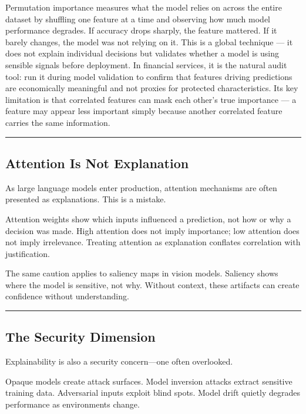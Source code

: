 \documentclass[
  letterpaper,
  DIV=11,
  numbers=noendperiod]{scrartcl}
\begin{document}
Permutation importance measures what the model relies on across the
entire dataset by shuffling one feature at a time and observing how much
model performance degrades. If accuracy drops sharply, the feature
mattered. If it barely changes, the model was not relying on it. This is
a global technique --- it does not explain individual decisions but
validates whether a model is using sensible signals before deployment.
In financial services, it is the natural audit tool: run it during model
validation to confirm that features driving predictions are economically
meaningful and not proxies for protected characteristics. Its key
limitation is that correlated features can mask each other's true
importance --- a feature may appear less important simply because
another correlated feature carries the same information.

\begin{center}\rule{0.5\linewidth}{0.5pt}\end{center}

\subsection{Attention Is Not
Explanation}\label{attention-is-not-explanation}

As large language models enter production, attention mechanisms are
often presented as explanations. This is a mistake.

Attention weights show which inputs influenced a prediction, not how or
why a decision was made. High attention does not imply importance; low
attention does not imply irrelevance. Treating attention as explanation
conflates correlation with justification.

The same caution applies to saliency maps in vision models. Saliency
shows where the model is sensitive, not why. Without context, these
artifacts can create confidence without understanding.

\begin{center}\rule{0.5\linewidth}{0.5pt}\end{center}

\subsection{The Security Dimension}\label{the-security-dimension}

Explainability is also a security concern---one often overlooked.

Opaque models create attack surfaces. Model inversion attacks extract
sensitive training data. Adversarial inputs exploit blind spots. Model
drift quietly degrades performance as environments change.
\end{document}
